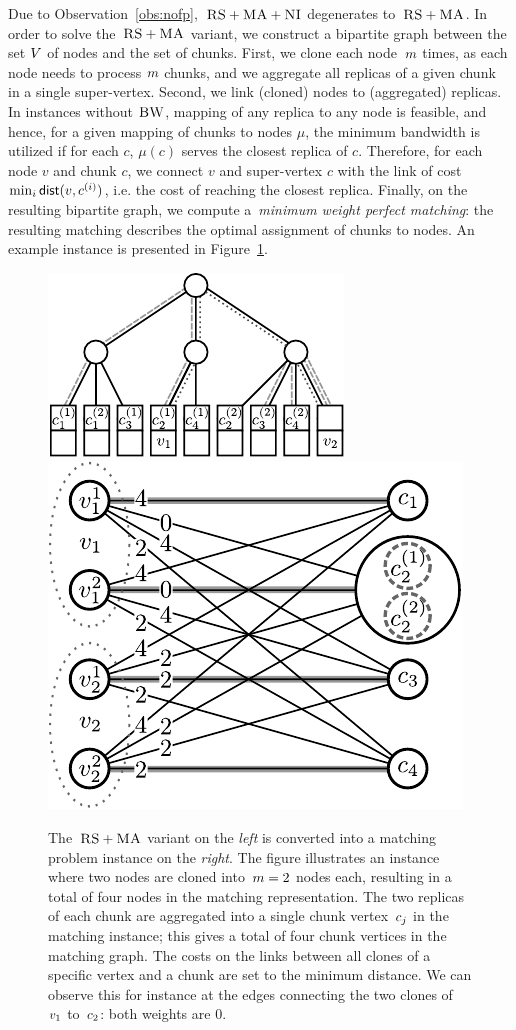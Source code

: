  Due to Observation~\ref{obs:nofp},~$\textsc{RS}+\textsc{MA}+\textsc{NI}$ degenerates to~$\textsc{RS}+\textsc{MA}$.
In order to solve the~$\textsc{RS}+\textsc{MA}$ variant,
we construct a bipartite
graph between the set
$V$ of nodes and
the set of chunks.
First, we clone each node~$m$ times,
as each node needs to process
$m$ chunks, and we aggregate all replicas of a given chunk in a
single %
super-vertex.
Second, we link (cloned) nodes to (aggregated) replicas.
In instances without $\textsc{BW}$, mapping of any replica to any node is feasible, and hence, for a given mapping of chunks to nodes $\mu$, the minimum bandwidth is utilized if for each $c$, $\mu(c)$ serves the closest replica of $c$.
Therefore, for each node $v$ and chunk $c$, we connect $v$ and super-vertex $c$ with the link of cost $\min_i \mathrm{\textsf{dist}}(v,c^{(i)})$, i.e. the cost of reaching the closest replica.
Finally, on the resulting bipartite graph, we compute a~\emph{minimum weight
perfect
matching}:
the resulting matching describes the optimal assignment of chunks to nodes.
An example instance is presented in Figure~\ref{fig:matching}.


\begin{figure}
\includegraphics[width = 0.49\columnwidth]{figs/static-mapping/model_ma_r_cv_boxes}
\hfill
\includegraphics[width =0.49\columnwidth]{figs/static-mapping/matching}
\caption{The~$\textsc{RS}+\textsc{MA}$ variant on the \emph{left} is converted into a
  matching problem instance on the \emph{right}.
The figure illustrates
an instance where two nodes are
cloned into~$m = 2$ nodes each,
resulting in a total of four nodes in
the matching representation.
The two replicas of each chunk are
aggregated into a single chunk vertex~$c_j$  in the matching instance;
this gives a total of four chunk vertices in the matching graph. The costs
on the links between all clones of a specific vertex and a chunk are set to
the minimum distance. We can observe this for instance at the edges connecting
the two clones of~$v_1$ to~$c_2$: both weights are 0.
}
\label{fig:matching}
\end{figure}

